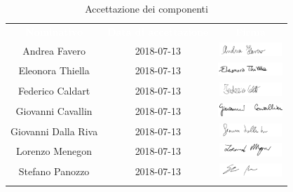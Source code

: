 \begin{longtable}{ c  c  c }
	\rowcolor{bluSOS}
	\textcolor{white}{\textbf{Nominativo}} & \textcolor{white}{\textbf{Data di accettazione}} & \textcolor{white}{\textbf{Firma}}\\
	Andrea Favero & 2018-07-13 & \includegraphics[height=0.5cm]{img/Firme/AndreaFavero.png} \\
	
	Eleonora Thiella & 2018-07-13 & \includegraphics[height=0.5cm]{img/Firme/EleonoraThiella.png} \\
	
	Federico Caldart & 2018-07-13 & \includegraphics[height=0.5cm]{img/Firme/FedericoCaldart.png} \\
	
	Giovanni Cavallin & 2018-07-13 & \includegraphics[height=0.5cm]{img/Firme/GiovanniCavallin.png} \\
	
	Giovanni Dalla Riva & 2018-07-13 & \includegraphics[height=0.5cm]{img/Firme/GiovanniDallaRiva.png} \\
	
	Lorenzo Menegon & 2018-07-13 & \includegraphics[height=0.5cm]{img/Firme/LorenzoMenegon.png} \\
	
	Stefano Panozzo & 2018-07-13 & \includegraphics[height=0.5cm]{img/Firme/StefanoPanozzo.png} \\
	\rowcolor{white}\caption{Accettazione dei componenti}\\
\end{longtable}

\newpage
